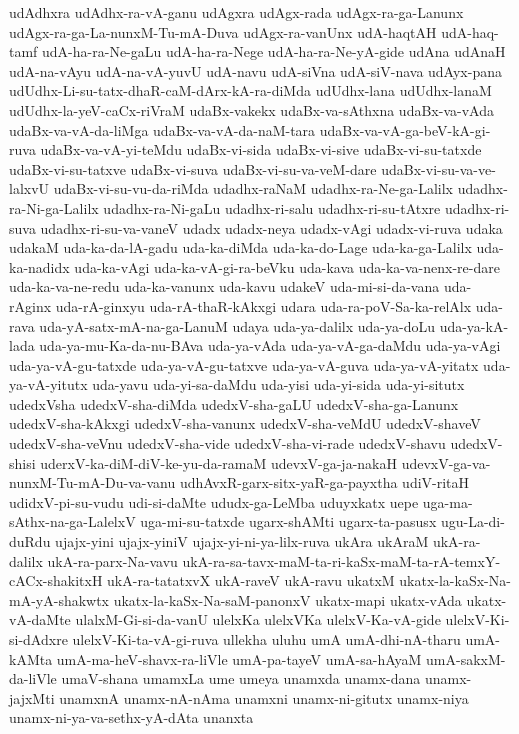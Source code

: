 {udAdhxra
udAdhx-ra-vA-ganu
udAgxra
udAgx-rada
udAgx-ra-ga-Lanunx
udAgx-ra-ga-La-nunxM-Tu-mA-Duva
udAgx-ra-vanUnx
udA-haqtAH
udA-haq-tamf
udA-ha-ra-Ne-gaLu
udA-ha-ra-Nege
udA-ha-ra-Ne-yA-gide
udAna
udAnaH
udA-na-vAyu
udA-na-vA-yuvU
udA-navu
udA-siVna
udA-siV-nava
udAyx-pana
udUdhx-Li-su-tatx-dhaR-caM-dArx-kA-ra-diMda
udUdhx-lana
udUdhx-lanaM
udUdhx-la-yeV-caCx-riVraM
udaBx-vakekx
udaBx-va-sAthxna
udaBx-va-vAda
udaBx-va-vA-da-liMga
udaBx-va-vA-da-naM-tara
udaBx-va-vA-ga-beV-kA-gi-ruva
udaBx-va-vA-yi-teMdu
udaBx-vi-sida
udaBx-vi-sive
udaBx-vi-su-tatxde
udaBx-vi-su-tatxve
udaBx-vi-suva
udaBx-vi-su-va-veM-dare
udaBx-vi-su-va-ve-lalxvU
udaBx-vi-su-vu-da-riMda
udadhx-raNaM
udadhx-ra-Ne-ga-Lalilx
udadhx-ra-Ni-ga-Lalilx
udadhx-ra-Ni-gaLu
udadhx-ri-salu
udadhx-ri-su-tAtxre
udadhx-ri-suva
udadhx-ri-su-va-vaneV
udadx
udadx-neya
udadx-vAgi
udadx-vi-ruva
udaka
udakaM
uda-ka-da-lA-gadu
uda-ka-diMda
uda-ka-do-Lage
uda-ka-ga-Lalilx
uda-ka-nadidx
uda-ka-vAgi
uda-ka-vA-gi-ra-beVku
uda-kava
uda-ka-va-nenx-re-dare
uda-ka-va-ne-redu
uda-ka-vanunx
uda-kavu
udakeV
uda-mi-si-da-vana
uda-rAginx
uda-rA-ginxyu
uda-rA-thaR-kAkxgi
udara
uda-ra-poV-Sa-ka-relAlx
uda-rava
uda-yA-satx-mA-na-ga-LanuM
udaya
uda-ya-dalilx
uda-ya-doLu
uda-ya-kA-lada
uda-ya-mu-Ka-da-nu-BAva
uda-ya-vAda
uda-ya-vA-ga-daMdu
uda-ya-vAgi
uda-ya-vA-gu-tatxde
uda-ya-vA-gu-tatxve
uda-ya-vA-guva
uda-ya-vA-yitatx
uda-ya-vA-yitutx
uda-yavu
uda-yi-sa-daMdu
uda-yisi
uda-yi-sida
uda-yi-situtx
udedxVsha
udedxV-sha-diMda
udedxV-sha-gaLU
udedxV-sha-ga-Lanunx
udedxV-sha-kAkxgi
udedxV-sha-vanunx
udedxV-sha-veMdU
udedxV-shaveV
udedxV-sha-veVnu
udedxV-sha-vide
udedxV-sha-vi-rade
udedxV-shavu
udedxV-shisi
uderxV-ka-diM-diV-ke-yu-da-ramaM
udevxV-ga-ja-nakaH
udevxV-ga-va-nunxM-Tu-mA-Du-va-vanu
udhAvxR-garx-sitx-yaR-ga-payxtha
udiV-ritaH
udidxV-pi-su-vudu
udi-si-daMte
ududx-ga-LeMba
uduyxkatx
uepe
uga-ma-sAthx-na-ga-LalelxV
uga-mi-su-tatxde
ugarx-shAMti
ugarx-ta-pasusx
ugu-La-di-duRdu
ujajx-yini
ujajx-yiniV
ujajx-yi-ni-ya-lilx-ruva
ukAra
ukAraM
ukA-ra-dalilx
ukA-ra-parx-Na-vavu
ukA-ra-sa-tavx-maM-ta-ri-kaSx-maM-ta-rA-temxY-cACx-shakitxH
ukA-ra-tatatxvX
ukA-raveV
ukA-ravu
ukatxM
ukatx-la-kaSx-Na-mA-yA-shakwtx
ukatx-la-kaSx-Na-saM-panonxV
ukatx-mapi
ukatx-vAda
ukatx-vA-daMte
ulalxM-Gi-si-da-vanU
ulelxKa
ulelxVKa
ulelxV-Ka-vA-gide
ulelxV-Ki-si-dAdxre
ulelxV-Ki-ta-vA-gi-ruva
ullekha
uluhu
umA
umA-dhi-nA-tharu
umA-kAMta
umA-ma-heV-shavx-ra-liVle
umA-pa-tayeV
umA-sa-hAyaM
umA-sakxM-da-liVle
umaV-shana
umamxLa
ume
umeya
unamxda
unamx-dana
unamx-jajxMti
unamxnA
unamx-nA-nAma
unamxni
unamx-ni-gitutx
unamx-niya
unamx-ni-ya-va-sethx-yA-dAta
unanxta
}
